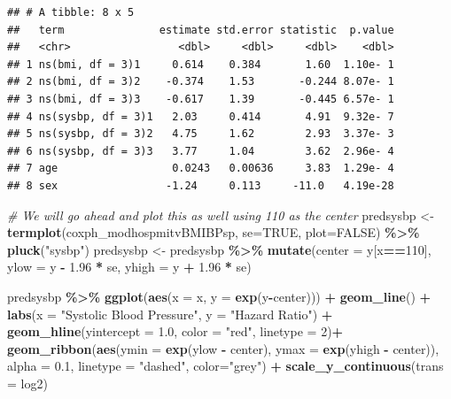 \documentclass[
]{book}
\newenvironment{Shaded}{\begin{snugshade}}{\end{snugshade}}
\newcommand{\AttributeTok}[1]{\textcolor[rgb]{0.13,0.29,0.53}{#1}}
\newcommand{\CommentTok}[1]{\textcolor[rgb]{0.56,0.35,0.01}{\textit{#1}}}
\newcommand{\ConstantTok}[1]{\textcolor[rgb]{0.56,0.35,0.01}{#1}}
\newcommand{\DecValTok}[1]{\textcolor[rgb]{0.00,0.00,0.81}{#1}}
\newcommand{\FloatTok}[1]{\textcolor[rgb]{0.00,0.00,0.81}{#1}}
\newcommand{\FunctionTok}[1]{\textcolor[rgb]{0.13,0.29,0.53}{\textbf{#1}}}
\newcommand{\NormalTok}[1]{#1}
\newcommand{\OtherTok}[1]{\textcolor[rgb]{0.56,0.35,0.01}{#1}}
\newcommand{\SpecialCharTok}[1]{\textcolor[rgb]{0.81,0.36,0.00}{\textbf{#1}}}
\newcommand{\StringTok}[1]{\textcolor[rgb]{0.31,0.60,0.02}{#1}}
\begin{document}
\begin{verbatim}
## # A tibble: 8 x 5
##   term               estimate std.error statistic  p.value
##   <chr>                 <dbl>     <dbl>     <dbl>    <dbl>
## 1 ns(bmi, df = 3)1     0.614    0.384       1.60  1.10e- 1
## 2 ns(bmi, df = 3)2    -0.374    1.53       -0.244 8.07e- 1
## 3 ns(bmi, df = 3)3    -0.617    1.39       -0.445 6.57e- 1
## 4 ns(sysbp, df = 3)1   2.03     0.414       4.91  9.32e- 7
## 5 ns(sysbp, df = 3)2   4.75     1.62        2.93  3.37e- 3
## 6 ns(sysbp, df = 3)3   3.77     1.04        3.62  2.96e- 4
## 7 age                  0.0243   0.00636     3.83  1.29e- 4
## 8 sex                 -1.24     0.113     -11.0   4.19e-28
\end{verbatim}

\begin{Shaded}
\begin{Highlighting}[]
\CommentTok{\# We will go ahead and plot this as well using 110 as the center}
\NormalTok{predsysbp }\OtherTok{\textless{}{-}} \FunctionTok{termplot}\NormalTok{(coxph\_modhospmitvBMIBPsp, }\AttributeTok{se=}\ConstantTok{TRUE}\NormalTok{, }\AttributeTok{plot=}\ConstantTok{FALSE}\NormalTok{) }\SpecialCharTok{\%\textgreater{}\%} 
  \FunctionTok{pluck}\NormalTok{(}\StringTok{"sysbp"}\NormalTok{)}
\NormalTok{predsysbp }\OtherTok{\textless{}{-}}\NormalTok{ predsysbp }\SpecialCharTok{\%\textgreater{}\%}  
  \FunctionTok{mutate}\NormalTok{(}\AttributeTok{center =}\NormalTok{ y[x}\SpecialCharTok{==}\DecValTok{110}\NormalTok{],}
         \AttributeTok{ylow =}\NormalTok{ y }\SpecialCharTok{{-}} \FloatTok{1.96} \SpecialCharTok{*}\NormalTok{ se,}
         \AttributeTok{yhigh =}\NormalTok{ y }\SpecialCharTok{+} \FloatTok{1.96} \SpecialCharTok{*}\NormalTok{ se)}

\NormalTok{predsysbp }\SpecialCharTok{\%\textgreater{}\%}
  \FunctionTok{ggplot}\NormalTok{(}\FunctionTok{aes}\NormalTok{(}\AttributeTok{x =}\NormalTok{ x, }\AttributeTok{y =} \FunctionTok{exp}\NormalTok{(y}\SpecialCharTok{{-}}\NormalTok{center))) }\SpecialCharTok{+} 
  \FunctionTok{geom\_line}\NormalTok{() }\SpecialCharTok{+}
  \FunctionTok{labs}\NormalTok{(}\AttributeTok{x =} \StringTok{"Systolic Blood Pressure"}\NormalTok{, }
       \AttributeTok{y =} \StringTok{"Hazard Ratio"}\NormalTok{) }\SpecialCharTok{+} 
  \FunctionTok{geom\_hline}\NormalTok{(}\AttributeTok{yintercept =} \FloatTok{1.0}\NormalTok{, }\AttributeTok{color =} \StringTok{"red"}\NormalTok{, }\AttributeTok{linetype =} \DecValTok{2}\NormalTok{)}\SpecialCharTok{+}
  \FunctionTok{geom\_ribbon}\NormalTok{(}\FunctionTok{aes}\NormalTok{(}\AttributeTok{ymin =} \FunctionTok{exp}\NormalTok{(ylow }\SpecialCharTok{{-}}\NormalTok{ center), }\AttributeTok{ymax =} \FunctionTok{exp}\NormalTok{(yhigh }\SpecialCharTok{{-}}\NormalTok{ center)), }
              \AttributeTok{alpha =} \FloatTok{0.1}\NormalTok{, }
              \AttributeTok{linetype =} \StringTok{"dashed"}\NormalTok{,}
              \AttributeTok{color=}\StringTok{"grey"}\NormalTok{) }\SpecialCharTok{+}
  \FunctionTok{scale\_y\_continuous}\NormalTok{(}\AttributeTok{trans =} \StringTok{\textquotesingle{}log2\textquotesingle{}}\NormalTok{)}
\end{Highlighting}
\end{Shaded}
\end{document}

